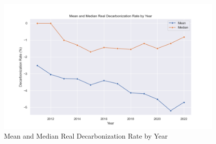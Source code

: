 \begin{figure}[H]
    \begin{center}
    \includegraphics[width=5in]{figures/mean_decarbonization_rate_year.png}
    \caption{Mean and Median Real Decarbonization Rate by Year}
    \label{fig:mean-decarbonization-rate-by-year}
    \end{center}
\end{figure}





